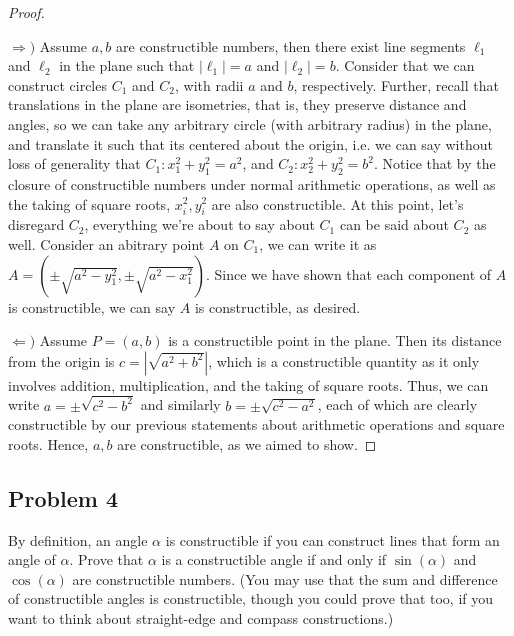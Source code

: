 \documentclass[letterpaper, 12pt]{amsart}
\theoremstyle{definition}  %
\newcommand{\Ra}{\Rightarrow}                   %
\newcommand{\La}{\Leftarrow}                    %
\begin{document}
	\begin{proof} \

	$\Ra)$ Assume $a,b$ are constructible numbers, then there exist line segments $\ell_{1}$ and $\ell_{2}$ in the plane such that $|\ell_{1}| = a$ and $|\ell_{2}| = b$.
	Consider that we can construct circles $C_{1}$ and $C_{2}$, with radii $a$ and $b$, respectively.
	Further, recall that translations in the plane are isometries, that is, they preserve distance and angles, so we can take any arbitrary circle (with arbitrary radius) in the plane, and translate it such that its centered about the origin, i.e. we can say without loss of generality that $C_{1} : x_{1}^{2} + y_{1}^{2} = a^{2}$, and $C_{2} : x_{2}^{2} + y_{2}^{2} = b^{2}$.
	Notice that by the closure of constructible numbers under normal arithmetic operations, as well as the taking of square roots, $x_{i}^{2}, y_{i}^{2}$ are also constructible.
	At this point, let's disregard $C_{2}$, everything we're about to say about $C_{1}$ can be said about $C_{2}$ as well.
	Consider an abitrary point $A$ on $C_{1}$, we can write it as $A = (\pm\sqrt{a^{2} - y_{1}^{2}}, \pm\sqrt{a^{2} - x_{1}^{2}})$.
	Since we have shown that each component of $A$ is constructible, we can say $A$ is constructible, as desired.

	$\La)$ Assume $P = (a,b)$ is a constructible point in the plane.
	Then its distance from the origin is $c = |\sqrt{a^2 + b^2}|$, which is a constructible quantity as it only involves addition, multiplication, and the taking of square roots.
	Thus, we can write $a = \pm\sqrt{c^{2} - b^{2}}$ and similarly $b = \pm\sqrt{c^{2} - a^{2}}$, each of which are clearly constructible by our previous statements about arithmetic operations and square roots.
	Hence, $a,b$ are constructible, as we aimed to show.
	\end{proof}

	\subsection*{Problem 4}
	\label{sub:problem_4}
	By definition, an angle $\alpha$ is constructible if you can construct lines that form an angle of $\alpha$. 
	Prove that $\alpha$ is a constructible angle if and only if $\sin(\alpha)$ and $\cos(\alpha)$ are constructible numbers. 
	(You may use that the sum and difference of constructible angles is constructible, though you could prove that too, if you want to think about straight-edge and compass constructions.)
\end{document}
